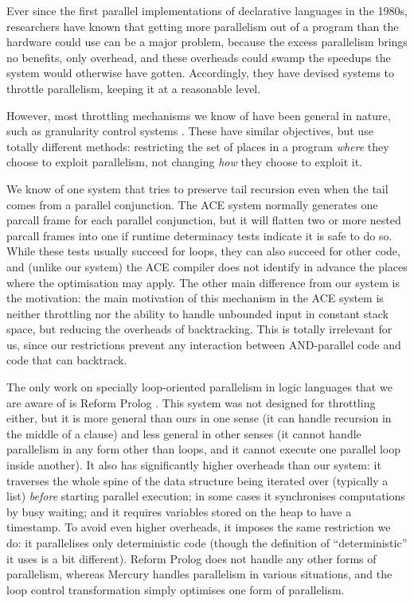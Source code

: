 Ever since the first parallel implementations
of declarative languages in the 1980s,
researchers have known that getting more parallelism out of a program
than the hardware could use can be a major problem,
because the excess parallelism brings no benefits, only overhead,
and these overheads could swamp
the speedups the system would otherwise have gotten.
Accordingly, they have devised systems to throttle parallelism,
keeping it at a reasonable level.

However, most throttling mechanisms we know of
have been general in nature,
such as granularity control systems
\citep{lopez96:granularity,
king:lower_bound_time_complexity,
shen_98_granularity-control}.
These have similar objectives,
but use totally different methods:
restricting the set of places in a program
\emph{where} they choose to exploit parallelism,
not changing \emph{how} they choose to exploit it.

We know of one system that tries to preserve tail recursion
even when the tail comes from a parallel conjunction.
The ACE system \citep{gupta01:optimization_for_parallel_nodet_code}
normally generates one parcall frame for each parallel conjunction,
but it will flatten two or more nested parcall frames into one
if runtime determinacy tests indicate it is safe to do so.
While these tests usually succeed for loops,
they can also succeed for other code,
and (unlike our system) the ACE compiler does not identify in advance
the places where the optimisation may apply.
The other main difference from our system is the motivation:
the main motivation of this mechanism in the ACE system is
neither throttling
nor the ability to handle unbounded input in constant stack space,
but reducing the overheads of backtracking.
This is totally irrelevant for us,
since our restrictions prevent any interaction
between AND-parallel code and code that can backtrack.

The only work on specially loop-oriented parallelism in logic languages
that we are aware of is Reform Prolog \citep{bevemyr:reform}.
This system was not designed for throttling either,
but it is more general than ours in one sense
(it can handle recursion in the middle of a clause)
and less general in other senses
(it cannot handle parallelism in any form other than loops,
and it cannot execute one parallel loop inside another).
It also has significantly higher overheads than our system:
it traverses the whole spine of the data structure being iterated over
(typically a list) \emph{before} starting parallel execution;
in some cases it synchronises computations by busy waiting;
and it requires variables stored on the heap to have a timestamp.
To avoid even higher overheads,
it imposes the same restriction we do:
it parallelises only deterministic code
(though the definition of ``deterministic'' it uses is a bit different).
Reform Prolog does not handle any other forms of parallelism,
whereas Mercury handles parallelism in various situations,
and the loop control transformation simply optimises one form of
parallelism.

